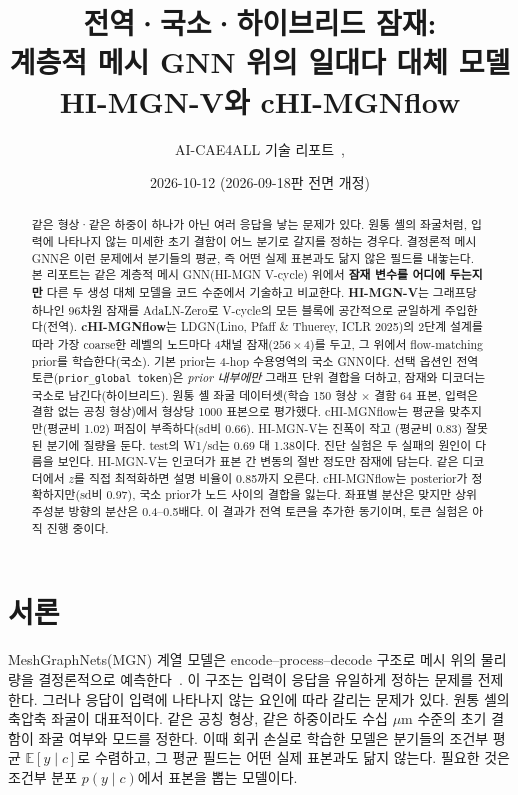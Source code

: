 \documentclass[11pt]{article}
\title{전역·국소·하이브리드 잠재:\\계층적 메시 GNN 위의 일대다 대체 모델\\HI-MGN-V와 cHI-MGNflow}
\author{AI-CAE4ALL 기술 리포트\
  \small\code{methods/MeshGraphNets\_Variational}, \code{methods/HI\_MGNFlow}}
\date{2026-10-12 (2026-09-18판 전면 개정)}
\newcommand{\E}{\mathbb{E}}
\newcommand{\code}[1]{\texttt{#1}}
\begin{document}
\maketitle

\begin{abstract}
같은 형상·같은 하중이 하나가 아닌 여러 응답을 낳는 문제가 있다. 원통
셸의 좌굴처럼, 입력에 나타나지 않는 미세한 초기 결함이 어느 분기로 갈지를
정하는 경우다. 결정론적 메시 GNN은 이런 문제에서 분기들의 평균, 즉 어떤
실제 표본과도 닮지 않은 필드를 내놓는다. 본 리포트는 같은 계층적 메시
GNN(HI-MGN V-cycle) 위에서 \textbf{잠재 변수를 어디에 두는지만} 다른 두
생성 대체 모델을 코드 수준에서 기술하고 비교한다.
\textbf{HI-MGN-V}는 그래프당 하나인 96차원 잠재를 AdaLN-Zero로 V-cycle의
모든 블록에 공간적으로 균일하게 주입한다(전역).
\textbf{cHI-MGNflow}는 LDGN(Lino, Pfaff \& Thuerey, ICLR 2025)의 2단계
설계를 따라 가장 coarse한 레벨의 노드마다 4채널 잠재($256\times4$)를 두고,
그 위에서 flow-matching prior를 학습한다(국소). 기본 prior는 4-hop
수용영역의 국소 GNN이다. 선택 옵션인 전역 토큰(\code{prior\_global token})은
\emph{prior 내부에만} 그래프 단위 결합을 더하고, 잠재와 디코더는 국소로
남긴다(하이브리드).
원통 셸 좌굴 데이터셋(학습 150 형상 $\times$ 결함 64 표본, 입력은 결함 없는
공칭 형상)에서 형상당 1000 표본으로 평가했다. cHI-MGNflow는 평균을
맞추지만(평균비 1.02) 퍼짐이 부족하다(sd비 0.66). HI-MGN-V는 진폭이 작고
(평균비 0.83) 잘못된 분기에 질량을 둔다. test의 W1/sd는 0.69 대 1.38이다.
진단 실험은 두 실패의 원인이 다름을 보인다. HI-MGN-V는 인코더가 표본 간
변동의 절반 정도만 잠재에 담는다. 같은 디코더에서 $z$를 직접 최적화하면
설명 비율이 0.85까지 오른다. cHI-MGNflow는 posterior가 정확하지만(sd비
0.97), 국소 prior가 노드 사이의 결합을 잃는다. 좌표별 분산은 맞지만 상위
주성분 방향의 분산은 0.4--0.5배다. 이 결과가 전역 토큰을 추가한 동기이며,
토큰 실험은 아직 진행 중이다.
\end{abstract}

\tableofcontents

\section{서론}\label{sec:intro}

MeshGraphNets(MGN) 계열 모델은 encode--process--decode 구조로 메시 위의
물리량을 결정론적으로 예측한다~\cite{pfaff2021}. 이 구조는 입력이 응답을
유일하게 정하는 문제를 전제한다. 그러나 응답이 입력에 나타나지 않는
요인에 따라 갈리는 문제가 있다. 원통 셸의 축압축 좌굴이 대표적이다. 같은
공칭 형상, 같은 하중이라도 수십 $\mu$m 수준의 초기 결함이 좌굴 여부와
모드를 정한다. 이때 회귀 손실로 학습한 모델은 분기들의 조건부 평균
$\E[y\mid c]$로 수렴하고, 그 평균 필드는 어떤 실제 표본과도 닮지 않는다.
필요한 것은 조건부 분포 $p(y\mid c)$에서 표본을 뽑는 모델이다.
\end{document}
